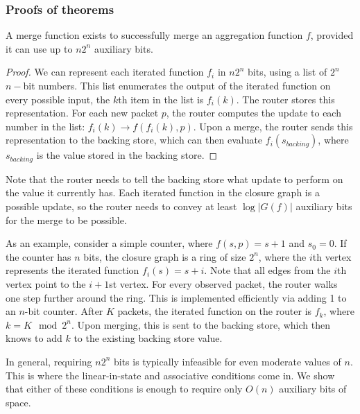 \subsubsection{Proofs of theorems}
\label{ss:proofs}

\begin{theorem}
A merge function exists to successfully merge an aggregation function $f$,
provided it can use up to $n2^n$ auxiliary bits.
\end{theorem}
\begin{proof}
We can represent each iterated function $f_i$ in $n2^n$ bits, using a list of $2^n$ $n-$bit numbers. This list enumerates the output of the iterated function on every possible input, \ie the $k$th item in the list is $f_i(k)$. The router stores this representation. For each new packet $p$, the router computes the update to each number in the list: $f_i(k) \rightarrow f(f_i(k), p)$. Upon a merge, the router sends this representation to the backing store, which can then evaluate $f_i(s_{backing})$, where $s_{backing}$ is the value stored in the backing store.
\end{proof}

Note that the router needs to tell the backing store what update to perform on the value it currently has. Each iterated function in the closure graph is a possible update, so the router needs to convey at least $\log |G(f)|$ auxiliary bits for the merge to be possible.

As an example, consider a simple counter, where $f(s, p) = s + 1$ and $s_0 = 0$. If the counter has $n$ bits, the closure graph is a ring of size $2^n$, where the $i$th vertex represents the iterated function $f_i(s) = s + i$. Note that all edges from the $i$th vertex point to the $i+1$st vertex. For every observed packet, the router walks one step further around the ring. This is implemented efficiently via adding 1 to an $n$-bit counter. After $K$ packets, the iterated function on the router is $f_{k}$, where $k = K \mod 2^n$. Upon merging, this is sent to the backing store, which then knows to add $k$ to the existing backing store value.

In general, requiring $n2^n$ bits is typically infeasible for even moderate values of $n$. This is where the linear-in-state and associative conditions come in. We show that either of these conditions is enough to require only $O(n)$ auxiliary bits of space.

